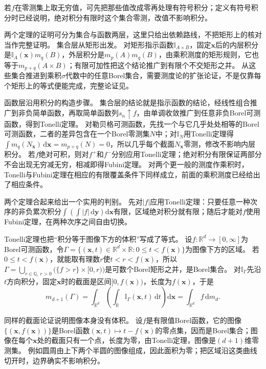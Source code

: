 若$f$在零测集上取无穷值，可先把那些值改成零再处理有符号积分；定义有符号积分时已经说明，绝对积分有限时这个集合零测，改值不影响积分。

两个定理的证明可分为集合与函数两层，这里只给出依赖路线，不把矩形上的核对当作完整证明。
集合层从矩形出发。
对矩形指示函数$\mathbb I_{A\times B}$，固定$\bm x$后的内层积分是$\mathbb I_A(\bm x)m_q(B)$，外层积分是$m_p(A)m_q(B)$，由乘积测度的矩形规则，它也等于$m_{p+q}(A\times B)$；有限可加性把这个结论推广到有限个不交矩形之并。
从这些集合推进到乘积$\sigma$代数中的任意Borel集合，需要测度论的扩张论证，不是仅靠每个矩形上的等式便能完成，完整论证见。

函数层沿用积分的构造步骤。
集合层的结论就是指示函数的结论，经线性组合推广到非负简单函数，再取简单函数列$s_n\uparrow f$，由单调收敛推广到任意非负Borel可测函数，得到Tonelli定理。
对勒贝格可测函数，先找一个与它几乎处处相等的Borel可测函数，二者的差异包含在一个Borel零测集$N$中；对$\mathbb I_N$用Tonelli定理得$\int m_q(N_{\bm x})\,\mathrm d\bm x=m_{p+q}(N)=0$，所以几乎每个截面$N_{\bm x}$零测，修改不影响内层积分。
若$f$绝对可积，则对$f^+$和$f^-$分别应用Tonelli定理；绝对积分有限保证两部分不会出现无穷减无穷，相减即得Fubini定理。
对两个更一般的测度作乘积时，Tonelli与Fubini定理在相应的有限覆盖条件下同样成立，前面的乘积测度已经给出了相应条件。

两个定理合起来给出一个实用的判别。
先对$|f|$应用Tonelli定理：只要任意一种次序的非负累次积分$\int\left(\int|f|\,\mathrm d\bm y\right)\mathrm d\bm x$有限，区域绝对积分就有限；随后才能对$f$使用Fubini定理，在两种次序之间自由切换。

Tonelli定理也把“积分等于图像下方的体积”写成了等式。
设$f:\mathbb R^d\to[0,\infty]$为Borel可测函数，令$\Gamma=\{(\bm x,t)\in\mathbb R^d\times\mathbb R:0\leq t<f(\bm x)\}$为图像下方的区域。
若$0\leq t<f(\bm x)$，就能取有理数$r$使$t<r<f(\bm x)$，所以
$\Gamma=\bigcup_{r\in\mathbb Q,\,r>0}\bigl(\{f>r\}\times[0,r)\bigr)$是可数个Borel矩形之并，是Borel集合。
对$\mathbb I_\Gamma$先沿$t$方向积分，固定$\bm x$时的截面是区间$[0,f(\bm x))$，长度为$f(\bm x)$，于是
\[
 m_{d+1}(\Gamma)=\int_{\mathbb R^d}\left(\int_{\mathbb R}\mathbb I_\Gamma(\bm x,t)\,\mathrm dt\right)\mathrm d\bm x=\int_{\mathbb R^d}f\,\mathrm dm_d.
\]

同样的截面论证说明图像本身没有体积。
设$f$是有限值Borel函数，它的图像$\{(\bm x,f(\bm x))\}$是Borel函数$(\bm x,t)\mapsto t-f(\bm x)$的零点集，因而是Borel集合；图像在每个$\bm x$处的截面只有一个点，长度为零，由Tonelli定理，图像是$(d+1)$维零测集。
例如圆周由上下两个半圆的图像组成，因此面积为零；把区域沿这类曲线切开时，边界确实不影响积分。

